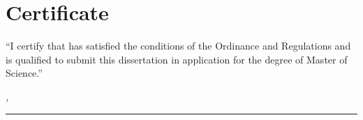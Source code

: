 %
\chapter*{Certificate}
\label{sec:certificate}
\thispagestyle{empty}


``I certify that \thesisName  has satisfied the conditions of the Ordinance and Regulations and is qualified to submit this dissertation in application for the degree of Master of Science.''

\bigskip

\noindent\textit{\thesisUniversityCity, \thesisDate}

\smallskip

\begin{flushright}
	\begin{minipage}{5cm}
		\rule{\textwidth}{1pt}
		\centering\thesisFirstSupervisor
	\end{minipage}
\end{flushright}

